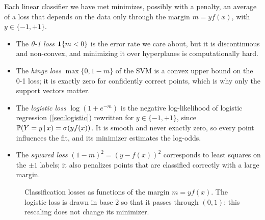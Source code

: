 \begin{remark}\label{rem:loss-comparison}
Each linear classifier we have met minimizes, possibly with a penalty, an average of a loss that depends on the data only through the margin $m=yf(x)$, with $y\in\{-1,+1\}$.
\begin{itemize}[nosep]
  \item The \emph{0-1 loss} $\mathbf{1}\{m<0\}$ is the error rate we care about, but it is discontinuous and non-convex, and minimizing it over hyperplanes is computationally hard.
  \item The \emph{hinge loss} $\max\{0,1-m\}$ of the SVM is a convex upper bound on the 0-1 loss; it is exactly zero for confidently correct points, which is why only the support vectors matter.
  \item The \emph{logistic loss} $\log(1+e^{-m})$ is the negative log-likelihood of logistic regression (\cref{sec:logistic}) rewritten for $y\in\{-1,+1\}$, since $\mathbb{P}(Y=y\,|\, x)=\sigma(yf(x))$. It is smooth and never exactly zero, so every point influences the fit, and its minimizer estimates the log-odds.
  \item The \emph{squared loss} $(1-m)^2=(y-f(x))^2$ corresponds to least squares on the $\pm1$ labels; it also penalizes points that are classified correctly with a large margin.
\end{itemize}
\end{remark}

\begin{figure}[ht]
\centering
{}
\caption{Classification losses as functions of the margin $m=yf(x)$. The logistic loss is drawn in base $2$ so that it passes through $(0,1)$; this rescaling does not change its minimizer.}
\label{fig:class-losses}
\end{figure}

